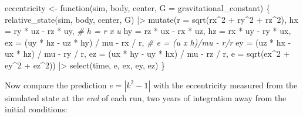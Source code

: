 \documentclass[
  10.5pt,
  letterpaper,
]{scrbook}
\newenvironment{Shaded}{\begin{snugshade}}{\end{snugshade}}
\newcommand{\AttributeTok}[1]{\textcolor[rgb]{0.00,0.00,0.00}{#1}}
\newcommand{\CommentTok}[1]{\textcolor[rgb]{0.00,0.00,0.00}{\textit{#1}}}
\newcommand{\ControlFlowTok}[1]{\textcolor[rgb]{0.00,0.00,0.00}{#1}}
\newcommand{\DecValTok}[1]{\textcolor[rgb]{0.00,0.00,0.00}{#1}}
\newcommand{\FunctionTok}[1]{\textcolor[rgb]{0.00,0.00,0.00}{#1}}
\newcommand{\NormalTok}[1]{\textcolor[rgb]{0.00,0.00,0.00}{#1}}
\newcommand{\OtherTok}[1]{\textcolor[rgb]{0.00,0.00,0.00}{#1}}
\newcommand{\SpecialCharTok}[1]{\textcolor[rgb]{0.00,0.00,0.00}{#1}}
\theoremstyle{definition}
\theoremstyle{plain}
\theoremstyle{remark}
\begin{document}
\begin{Shaded}
\begin{Highlighting}[]
\NormalTok{eccentricity }\OtherTok{\textless{}{-}} \ControlFlowTok{function}\NormalTok{(sim, body, center, }\AttributeTok{G =}\NormalTok{ gravitational\_constant) \{}
  \FunctionTok{relative\_state}\NormalTok{(sim, body, center, G) }\SpecialCharTok{|\textgreater{}}
    \FunctionTok{mutate}\NormalTok{(}\AttributeTok{r  =} \FunctionTok{sqrt}\NormalTok{(rx}\SpecialCharTok{\^{}}\DecValTok{2} \SpecialCharTok{+}\NormalTok{ ry}\SpecialCharTok{\^{}}\DecValTok{2} \SpecialCharTok{+}\NormalTok{ rz}\SpecialCharTok{\^{}}\DecValTok{2}\NormalTok{),}
           \AttributeTok{hx =}\NormalTok{ ry }\SpecialCharTok{*}\NormalTok{ uz }\SpecialCharTok{{-}}\NormalTok{ rz }\SpecialCharTok{*}\NormalTok{ uy,                   }\CommentTok{\# h = r x u}
           \AttributeTok{hy =}\NormalTok{ rz }\SpecialCharTok{*}\NormalTok{ ux }\SpecialCharTok{{-}}\NormalTok{ rx }\SpecialCharTok{*}\NormalTok{ uz,}
           \AttributeTok{hz =}\NormalTok{ rx }\SpecialCharTok{*}\NormalTok{ uy }\SpecialCharTok{{-}}\NormalTok{ ry }\SpecialCharTok{*}\NormalTok{ ux,}
           \AttributeTok{ex =}\NormalTok{ (uy }\SpecialCharTok{*}\NormalTok{ hz }\SpecialCharTok{{-}}\NormalTok{ uz }\SpecialCharTok{*}\NormalTok{ hy) }\SpecialCharTok{/}\NormalTok{ mu }\SpecialCharTok{{-}}\NormalTok{ rx }\SpecialCharTok{/}\NormalTok{ r,  }\CommentTok{\# e = (u x h)/mu {-} r/r}
           \AttributeTok{ey =}\NormalTok{ (uz }\SpecialCharTok{*}\NormalTok{ hx }\SpecialCharTok{{-}}\NormalTok{ ux }\SpecialCharTok{*}\NormalTok{ hz) }\SpecialCharTok{/}\NormalTok{ mu }\SpecialCharTok{{-}}\NormalTok{ ry }\SpecialCharTok{/}\NormalTok{ r,}
           \AttributeTok{ez =}\NormalTok{ (ux }\SpecialCharTok{*}\NormalTok{ hy }\SpecialCharTok{{-}}\NormalTok{ uy }\SpecialCharTok{*}\NormalTok{ hx) }\SpecialCharTok{/}\NormalTok{ mu }\SpecialCharTok{{-}}\NormalTok{ rz }\SpecialCharTok{/}\NormalTok{ r,}
           \AttributeTok{e  =} \FunctionTok{sqrt}\NormalTok{(ex}\SpecialCharTok{\^{}}\DecValTok{2} \SpecialCharTok{+}\NormalTok{ ey}\SpecialCharTok{\^{}}\DecValTok{2} \SpecialCharTok{+}\NormalTok{ ez}\SpecialCharTok{\^{}}\DecValTok{2}\NormalTok{)) }\SpecialCharTok{|\textgreater{}}
    \FunctionTok{select}\NormalTok{(time, e, ex, ey, ez)}
\NormalTok{\}}
\end{Highlighting}
\end{Shaded}

Now compare the prediction \(e = |k^2 - 1|\) with the eccentricity
measured from the simulated state at the \emph{end} of each run, two
years of integration away from the initial conditions:
\end{document}
